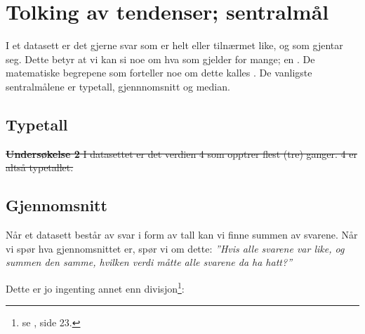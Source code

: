 \section{Tolking av tendenser; sentralmål}
I et datasett er det gjerne svar som er helt eller tilnærmet like, og som gjentar seg. Dette betyr at vi kan si noe om hva som gjelder for mange; en . De matematiske begrepene som forteller noe om dette kalles . De vanligste sentralmålene er typetall, gjennnomsnitt og median.
\subsection{Typetall}
 \regv
\st{
\textbf{Undersøkelse 2} \os
I datasettet er det verdien 4 som opptrer flest (tre) ganger. 4 er altså typetallet.
} 
\newpage
\subsection{Gjennomsnitt}
Når et datasett består av svar i form av tall kan vi finne summen av svarene. Når vi spør hva gjennomsnittet er, spør vi om dette: \os
\textsl{''Hvis alle svarene var like, og summen den samme, hvilken verdi måtte alle svarene da ha hatt?''}\os

Dette er jo ingenting annet enn divisjon\footnote{se \mb, side 23.}: \regv

\reg[Gjennomsnitt]{ \vs
\[ \text{gjennomsnitt}=\frac{\text{summen av verdiene fra datasettet}}{\text{antall verdier}} \]
} \regv

